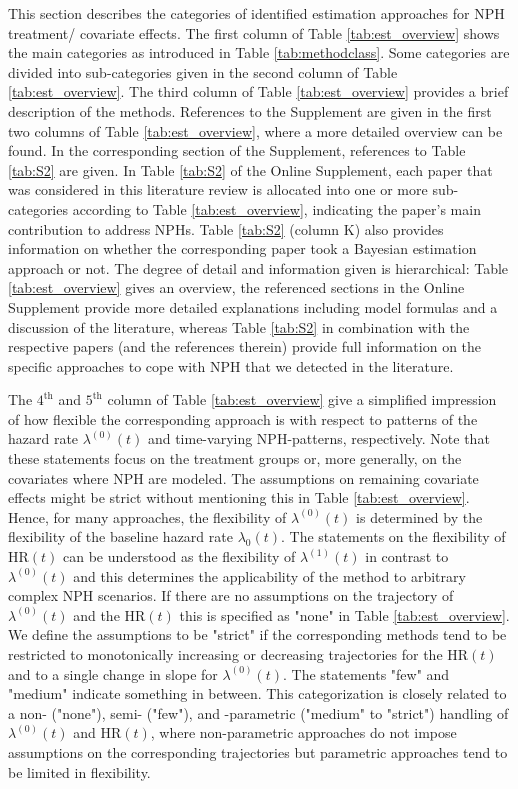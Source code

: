 \documentclass{article}
\begin{document}
\noindent
\noindent This section describes the categories of identified estimation approaches for NPH treatment/ covariate effects.
The first column of Table \ref{tab:est_overview} shows the main categories as introduced in Table \ref{tab:methodclass}. 
Some categories are divided into sub-categories given in the second column of Table \ref{tab:est_overview}.
The third column of Table \ref{tab:est_overview} provides a brief description of the methods.
References to the Supplement are given in the first two columns of Table \ref{tab:est_overview},
where a more detailed overview can be found.
In the corresponding section of the Supplement, references to Table \ref{tab:S2} are given.
In Table \ref{tab:S2} of the Online Supplement, each paper that was considered in this literature review is allocated into one or more sub-categories according to Table \ref{tab:est_overview}, indicating the paper's main contribution to address NPHs.
Table \ref{tab:S2} (column K) also provides information on whether the corresponding paper took a Bayesian estimation approach or not.
The degree of detail and information given is hierarchical: Table \ref{tab:est_overview} gives an overview, the referenced sections in the Online Supplement provide more detailed explanations including model formulas and a discussion of the literature, whereas Table \ref{tab:S2} in combination with the respective papers (and the references therein) provide full information on the specific approaches to cope with NPH that we detected in the literature.

\noindent The $4^{\text{th}}$ and $5^{\text{th}}$ column of Table \ref{tab:est_overview} give a simplified impression of how flexible the corresponding approach is with respect to patterns of the hazard rate $\lambda^{(0)}(t)$ and time-varying NPH-patterns, respectively.
Note that these statements focus on the treatment groups or, more generally, on the covariates where NPH are modeled. 
The assumptions on remaining covariate effects might be strict without mentioning this in Table \ref{tab:est_overview}.
Hence, for many approaches, the flexibility of $\lambda^{(0)}(t)$ is determined by the flexibility of the baseline hazard rate $\lambda_0(t)$.
The statements on the flexibility of $\text{HR}(t)$ can be understood as the flexibility of $\lambda^{(1)}(t)$ in contrast to $\lambda^{(0)}(t)$ and this determines the applicability of the method to arbitrary complex NPH scenarios.
If there are no assumptions on the trajectory of $\lambda^{(0)}(t)$ and the $\text{HR}(t)$ this is specified as "none" in %
Table \ref{tab:est_overview}. 
We define the assumptions to be "strict" if the corresponding methods tend to be restricted to monotonically increasing or decreasing trajectories for the $\text{HR}(t)$ and to a single change in slope for $\lambda^{(0)}(t)$.
The statements "few" and "medium" indicate something in between.
This categorization is closely related to a non- ("none"), semi- ("few"), and -parametric ("medium" to  "strict") handling of $\lambda^{(0)}(t)$ and $\text{HR}(t)$, where non-parametric approaches do not impose assumptions on the corresponding trajectories but parametric approaches tend to be limited in flexibility.
\end{document}
